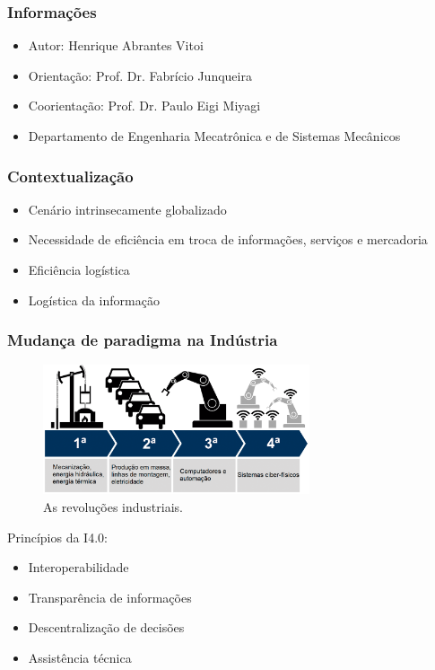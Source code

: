 \documentclass[10pt]{beamer}
\begin{document}
\begin{frame}
	\frametitle{Informações}
	
	\begin{itemize}
		\item Autor: Henrique Abrantes Vitoi
		\item Orientação: Prof. Dr. Fabrício Junqueira
		\item Coorientação: Prof. Dr. Paulo Eigi Miyagi
		\item Departamento de Engenharia Mecatrônica e de Sistemas Mecânicos
		
	\end{itemize}

\end{frame}
\begin{frame}
	\frametitle{Contextualização}
		
	\begin{itemize}
		\item Cenário intrinsecamente globalizado
		\item Necessidade de eficiência em troca de informações, serviços e mercadoria
		\item Eficiência logística
		\item Logística da informação
	\end{itemize}

\end{frame}
\begin{frame}
	\frametitle{Mudança de paradigma na Indústria}
	
	\begin{figure}[htb]
		\centering
		\caption{As revoluções industriais.}
		\label{fig:i4}
		\includegraphics[width=0.7\textwidth]{i4.png}
	\end{figure}

	Princípios da I4.0:
	\begin{itemize}
		\item Interoperabilidade
		\item Transparência de informações
		\item Descentralização de decisões
		\item Assistência técnica
	\end{itemize}
	
\end{frame}
\end{document}
